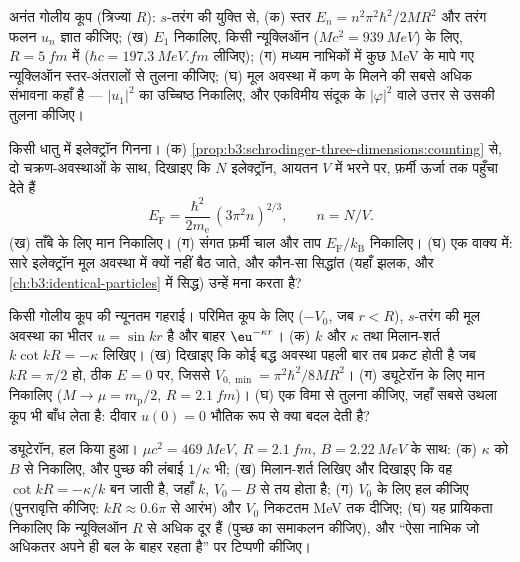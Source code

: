 \begin{exercise}[$\star\star$]\label{exo:b3:schrodinger-three-dimensions:7}
अनंत गोलीय कूप (त्रिज्या $R$): $s$-तरंग की युक्ति से,
(क) स्तर $E_n = n^2\pi^2\hbar^2/2MR^2$ और तरंग फलन
$u_n$ ज्ञात कीजिए; (ख) $E_1$ निकालिए, किसी न्यूक्लिऑन ($Mc^2 =
\qty{939}{MeV}$) के लिए, $R = \qty{5}{fm}$ में ($\hbar c =
\qty{197.3}{MeV.fm}$ लीजिए); (ग) मध्यम नाभिकों में कुछ MeV के मापे गए
न्यूक्लिऑन स्तर-अंतरालों से तुलना कीजिए; (घ) मूल अवस्था में कण के
मिलने की सबसे अधिक संभावना कहाँ है --- $|u_1|^2$ का उच्चिष्ठ निकालिए,
और एकविमीय संदूक के $|\varphi|^2$ वाले उत्तर से उसकी तुलना कीजिए।
\end{exercise}

\begin{exercise}[$\star\star$]\label{exo:b3:schrodinger-three-dimensions:8}
किसी धातु में इलेक्ट्रॉन गिनना। (क)
\cref{prop:b3:schrodinger-three-dimensions:counting} से, दो चक्रण-अवस्थाओं
के साथ, दिखाइए कि $N$ इलेक्ट्रॉन, आयतन $V$ में भरने पर,
फ़र्मी ऊर्जा तक पहुँचा देते हैं
\[
E_{\text{F}} = \frac{\hbar^2}{2m_{\text{e}}}\,(3\pi^2n)^{2/3} ,
\qquad n = N/V .
\]
(ख) ताँबे के लिए मान निकालिए। (ग) संगत फ़र्मी चाल और
ताप $E_{\text{F}}/k_{\text{B}}$ निकालिए। (घ) एक वाक्य में:
सारे इलेक्ट्रॉन मूल अवस्था में क्यों नहीं बैठ जाते, और कौन-सा
सिद्धांत (यहाँ झलक, और
\cref{ch:b3:identical-particles} में सिद्ध) उन्हें मना करता है?
\end{exercise}

\begin{exercise}[$\star\star$]\label{exo:b3:schrodinger-three-dimensions:9}
किसी गोलीय कूप की न्यूनतम गहराई। परिमित कूप के लिए ($-V_0$, जब
$r < R$), $s$-तरंग की मूल अवस्था का भीतर $u = \sin kr$ है और बाहर
$\eu^{-\kappa r}$। (क) $k$ और $\kappa$ तथा मिलान-शर्त
$k\cot kR = -\kappa$ लिखिए। (ख) दिखाइए कि कोई बद्ध अवस्था पहली बार
तब प्रकट होती है जब $kR = \pi/2$ हो, ठीक $E = 0$ पर, जिससे
$V_{0,\min} = \pi^2\hbar^2/8MR^2$। (ग) ड्यूटेरॉन के लिए मान निकालिए
($M \to \mu = m_{\text{p}}/2$, $R = \qty{2.1}{fm}$)। (घ) एक विमा से
तुलना कीजिए, जहाँ सबसे उथला कूप भी बाँध लेता है: दीवार
$u(0) = 0$ भौतिक रूप से क्या बदल देती है?
\end{exercise}

\begin{exercise}[$\star\star\star$]\label{exo:b3:schrodinger-three-dimensions:10}
ड्यूटेरॉन, हल किया हुआ। $\mu c^2 = \qty{469}{MeV}$, $R =
\qty{2.1}{fm}$, $B = \qty{2.22}{MeV}$ के साथ: (क) $\kappa$ को $B$ से
निकालिए, और पुच्छ की लंबाई $1/\kappa$ भी; (ख) मिलान-शर्त लिखिए और
दिखाइए कि वह $\cot kR = -\kappa/k$ बन जाती है, जहाँ $k$, $V_0 - B$ से
तय होता है; (ग) $V_0$ के लिए हल कीजिए (पुनरावृत्ति कीजिए: $kR \approx 0.6\pi$
से आरंभ) और $V_0$ निकटतम MeV तक दीजिए; (घ) यह प्रायिकता निकालिए कि
न्यूक्लिऑन $R$ से अधिक दूर हैं (पुच्छ का समाकलन कीजिए), और
``ऐसा नाभिक जो अधिकतर अपने ही बल के बाहर रहता है'' पर टिप्पणी कीजिए।
\end{exercise}

